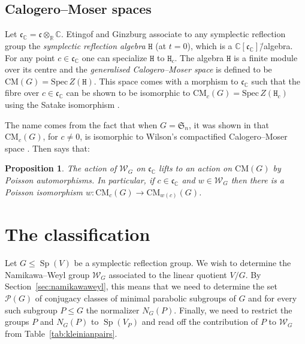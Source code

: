 \documentclass[10pt,a4paper]{amsart}
\newtheorem{proposition}[theorem]{Proposition}
\DeclareMathOperator{\Sp}{Sp}
\newcommand{\CC}{\mathbb C}
\newcommand{\RR}{\mathbb R}
\newcommand{\SRA}{\mathtt{H}}
\begin{document}
\subsection{Calogero--Moser spaces}\label{sec:CM}

Let $\mathfrak{c}_{\CC} = \mathfrak{c} \otimes_{\RR} \CC$. Etingof and Ginzburg \cite{EG} associate to any symplectic reflection group the \emph{symplectic reflection algebra} $\SRA$ (at $t = 0$), which is a $\CC[\mathfrak{c}_{\CC}]$\=/algebra. For any point $c \in \mathfrak{c}_{\CC}$ one can specialize $\SRA$ to $\SRA_c$. The algebra $\SRA$ is a finite module over its centre and the \emph{generalised Calogero--Moser space} is defined to be $\mathrm{CM}(G) = \mathrm{Spec} \, Z(\SRA)$. This space comes with a morphism to $\mathfrak{c}_{\CC}$ such that the fibre over $c \in \mathfrak{c}_{\CC}$ can be shown to be isomorphic to $\mathrm{CM}_c(G) = \mathrm{Spec} \, Z(\SRA_c)$ using the Satake isomorphism \cite[Thm.~3.1]{EG}. 

The name comes from the fact that when $G = \mathfrak{S}_n$, it was shown in \cite[Thm.~1.13]{EG} that $\mathrm{CM}_c(G)$, for $c \neq 0$, is isomorphic to Wilson's compactified Ca\-lo\-ge\-ro--Moser space \cite{Wilson}. Then \cite[Thm.~1.4]{Bel16} says that:

\begin{proposition}
	The action of $\mathcal{W}_G$ on $\mathfrak{c}_{\CC}$ lifts to an action on $\mathrm{CM}(G)$ by Poisson automorphisms. In particular, if $c \in \mathfrak{c}_{\CC}$ and $w \in \mathcal{W}_G$ then there is a Poisson isomorphism $w \colon \mathrm{CM}_c(G) \to \mathrm{CM}_{w(c)}(G)$. 
\end{proposition} 

\section{The classification}

Let \(G\leqslant\Sp(V)\) be a symplectic reflection group. We wish to determine the Namikawa--Weyl group \(\mathcal W_G\) associated to the linear quotient \(V/G\). By Section~\ref{sec:namikawaweyl}, this means that we need to determine the set \(\mathcal P(G)\) of conjugacy classes of minimal parabolic subgroups of \(G\) and for every such subgroup \(P\leqslant G\) the normalizer \(N_G(P)\). Finally, we need to restrict the groups \(P\) and \(N_G(P)\) to \(\Sp(V_P) \) and read off the contribution of \(P\) to \(\mathcal W_G\) from Table~\ref{tab:kleinianpairs}.
\end{document}
